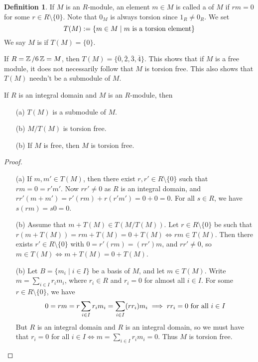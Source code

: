 \documentclass[11pt]{book}
\theoremstyle{definition}   \newtheorem{defn}[counter]{Definition} %
\newcommand{\ov}{\overline}   \newcommand{\wt}{\widetilde}
\newcommand{\bs}{\setminus}   \newcommand{\A}{\mathcal{A}}   \newcommand{\sy}{\textnormal{Syl}}   \newcommand{\size}[1]{\left| #1 \right|}
\newcommand{\vs}{\vspace{8pt}}
\numberwithin{counter}{chapter}
\begin{document}
\vs

\begin{defn}
If $M$ is an $R$-module, an element $m \in M$ is called a  of $M$ if $rm = 0$ for some $r \in R \bs \{0\}$. Note that $0_M$ is always torsion since $1_R \ne 0_R$. We set 
	\[ T(M) := \{m \in M \mid m \textnormal{ is a torsion element} \} \]
We say $M$ is  if $T(M) = \{0\}$. 
\end{defn}

\vs

\begin{example}
If $R = \operatorname{\mathbb{Z}}/6\operatorname{\mathbb{Z}} = M$, then $T(M) = \{\ov{0},\ov{2},\ov{3},\ov{4}\}$. This shows that if $M$ is a free module, it does not necessarily follow that $M$ is torsion free. This also shows that $T(M)$ needn't be a submodule of $M$. 
\end{example}

\vs

\begin{lemma}
If $R$ is an integral domain and $M$ is an $R$-module, then
\begin{enumerate}
\item[(a)] $T(M)$ is a submodule of $M$.
\item[(b)] $M/T(M)$ is torsion free.
\item[(b)] If $M$ is free, then $M$ is torsion free.
\end{enumerate}
\end{lemma}

\vs

\begin{proof}\ 
\begin{enumerate}
\item[(a)] If $m,m' \in T(M)$, then there exist $r,r' \in R \bs \{0\}$ such that $rm = 0 = r'm'$. Now $rr' \ne 0$ as $R$ is an integral domain, and $rr'(m + m') = r'(rm) + r(r'm') = 0 + 0 = 0$. For all $s \in R$, we have $s(rm) = s 0 = 0$.

\item[(b)] Assume that $m + T(M) \in T(M/T(M))$. Let $r \in R \bs \{0\}$ be such that $r(m + T(M)) = rm + T(M) = 0 + T(M) \iff rm \in T(M)$. Then there exists $r' \in R \bs \{0\}$ with $0 = r'(rm) = (rr')m$, and $rr' \ne 0$, so $m \in T(M) \iff m + T(M) = 0 + T(M)$. 

\item[(b)] Let $B = \{m_i \mid i \in I\}$ be a basis of $M$, and let $m \in T(M)$. Write $m = \sum_{i \in I} r_i m_i$, where $r_i \in R$ and $r_i = 0$ for almost all $i \in I$. For some $r \in R \bs \{0\}$, we have
	\[0 = rm = r \sum_{i \in I} r_i m_i = \sum_{i \in I} (rr_i) m_i \implies rr_i = 0 \textnormal{ for all } i \in I \] 
But $R$ is an integral domain and $R$ is an integral domain, so we must have that $r_i = 0$ for all $i \in I \iff m = \sum_{i \in I} r_i m_i = 0$. Thus $M$ is torsion free. 
\end{enumerate}
\end{proof}
\end{document}
